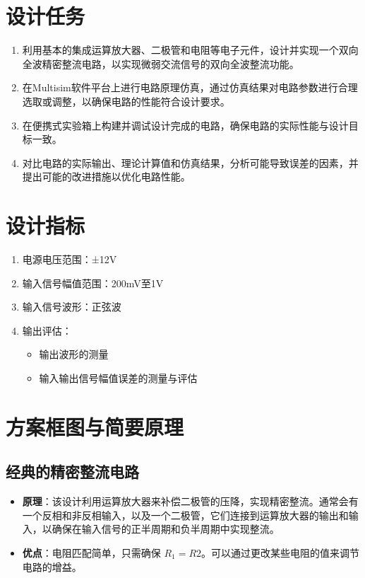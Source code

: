 \documentclass[UTF8,titlepage,a4paper]{ctexart}
\numberwithin{figure}{section}
\begin{document}
\section{设计任务}
\begin{enumerate}
    \item 利用基本的集成运算放大器、二极管和电阻等电子元件，设计并实现一个双向全波精密整流电路，以实现微弱交流信号的双向全波整流功能。
    \item 在Multisim软件平台上进行电路原理仿真，通过仿真结果对电路参数进行合理选取或调整，以确保电路的性能符合设计要求。
    \item 在便携式实验箱上构建并调试设计完成的电路，确保电路的实际性能与设计目标一致。
    \item 对比电路的实际输出、理论计算值和仿真结果，分析可能导致误差的因素，并提出可能的改进措施以优化电路性能。
\end{enumerate}

\section{设计指标}
\begin{enumerate}
    \item 电源电压范围：±12V
    \item 输入信号幅值范围：200mV至1V
    \item 输入信号波形：正弦波
    \item 输出评估：
       \begin{itemize}
           \item 输出波形的测量
           \item 输入输出信号幅值误差的测量与评估
       \end{itemize}
\end{enumerate}


\section{方案框图与简要原理}

\subsection{经典的精密整流电路}
\begin{itemize}
    \item \textbf{原理}：该设计利用运算放大器来补偿二极管的压降，实现精密整流。通常会有一个反相和非反相输入，以及一个二极管，它们连接到运算放大器的输出和输入，以确保在输入信号的正半周期和负半周期中实现整流。
    \item \textbf{优点}：电阻匹配简单，只需确保 \( R_1 = R2 \)。可以通过更改某些电阻的值来调节电路的增益。
\end{itemize}
\end{document}
